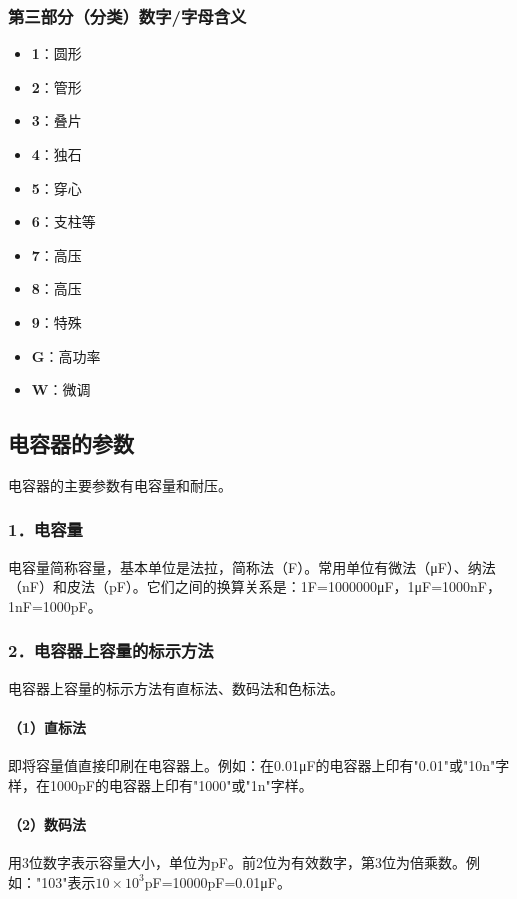 \documentclass[12pt,UTF8]{ctexbook}
\begin{document}
\subsubsection{第三部分（分类）数字/字母含义}

\begin{itemize}[leftmargin=2cm]
	\item \textbf{1}：圆形
	\item \textbf{2}：管形
	\item \textbf{3}：叠片
	\item \textbf{4}：独石
	\item \textbf{5}：穿心
	\item \textbf{6}：支柱等
	\item \textbf{7}：高压
	\item \textbf{8}：高压
	\item \textbf{9}：特殊
	\item \textbf{G}：高功率
	\item \textbf{W}：微调
\end{itemize}

\subsection{电容器的参数}

电容器的主要参数有电容量和耐压。

\subsubsection{1．电容量}

电容量简称容量，基本单位是法拉，简称法（F）。常用单位有微法（μF）、纳法（nF）和皮法（pF）。它们之间的换算关系是：1F=1000000μF，1μF=1000nF，1nF=1000pF。

\subsubsection{2．电容器上容量的标示方法}

电容器上容量的标示方法有直标法、数码法和色标法。

\paragraph{（1）直标法}
即将容量值直接印刷在电容器上。例如：在0.01μF的电容器上印有"0.01"或"10n"字样，在1000pF的电容器上印有"1000"或"1n"字样。

\paragraph{（2）数码法}
用3位数字表示容量大小，单位为pF。前2位为有效数字，第3位为倍乘数。例如："103"表示$10×10^3$pF=10000pF=0.01μF。
\end{document}
